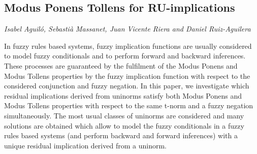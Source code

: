 \documentclass[../booklet.tex]{subfiles}
\begin{document}
\subsection[Modus Ponens Tollens for RU-implications. {\it Isabel Aguiló, Sebastià Massanet, Juan Vicente Riera and Daniel Ruiz-Aguilera}]{Modus Ponens Tollens for RU-implications}
   

\begin{center}
  {\it Isabel Aguiló, Sebastià Massanet, Juan Vicente Riera and Daniel Ruiz-Aguilera}
\end{center}

\vskip 0.8cm


In fuzzy rules based systems, fuzzy implication functions are usually considered to model fuzzy conditionals and to perform forward and backward inferences. These processes are guaranteed by the fulfilment of the Modus Ponens and Modus Tollens properties by the fuzzy implication function with respect to the considered conjunction and fuzzy negation. In this paper, we investigate which residual implications derived from uninorms satisfy both Modus Ponens and Modus Tollens properties with respect to the same t-norm and a fuzzy negation simultaneously. The most usual classes of uninorms are considered and many solutions are obtained which allow to model the fuzzy conditionals in a fuzzy rules based systems (and perform backward and forward inferences) with a unique residual implication derived from a uninorm.  
\end{document}
